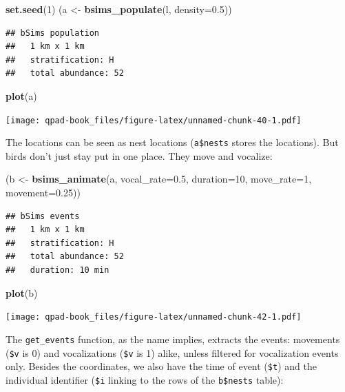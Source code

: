 \documentclass[12pt,]{book}
\newenvironment{Shaded}{\begin{snugshade}}{\end{snugshade}}
\newcommand{\DataTypeTok}[1]{\textcolor[rgb]{0.13,0.29,0.53}{#1}}
\newcommand{\DecValTok}[1]{\textcolor[rgb]{0.00,0.00,0.81}{#1}}
\newcommand{\FloatTok}[1]{\textcolor[rgb]{0.00,0.00,0.81}{#1}}
\newcommand{\KeywordTok}[1]{\textcolor[rgb]{0.13,0.29,0.53}{\textbf{#1}}}
\newcommand{\NormalTok}[1]{#1}
\newcommand{\StringTok}[1]{\textcolor[rgb]{0.31,0.60,0.02}{#1}}
\begin{document}
\begin{Shaded}
\begin{Highlighting}[]
\KeywordTok{set.seed}\NormalTok{(}\DecValTok{1}\NormalTok{)}
\NormalTok{(a <-}\StringTok{ }\KeywordTok{bsims_populate}\NormalTok{(l, }\DataTypeTok{density=}\FloatTok{0.5}\NormalTok{))}
\end{Highlighting}
\end{Shaded}

\begin{verbatim}
## bSims population
##   1 km x 1 km
##   stratification: H
##   total abundance: 52
\end{verbatim}

\begin{Shaded}
\begin{Highlighting}[]
\KeywordTok{plot}\NormalTok{(a)}
\end{Highlighting}
\end{Shaded}

\texttt{[image: qpad-book\_files/figure-latex/unnamed-chunk-40-1.pdf]}

The locations can be seen as nest locations (\texttt{a\$nests} stores the locations).
But birds don't just stay put in one place. They move and vocalize:

\begin{Shaded}
\begin{Highlighting}[]
\NormalTok{(b <-}\StringTok{ }\KeywordTok{bsims_animate}\NormalTok{(a, }
  \DataTypeTok{vocal_rate=}\FloatTok{0.5}\NormalTok{, }\DataTypeTok{duration=}\DecValTok{10}\NormalTok{,}
  \DataTypeTok{move_rate=}\DecValTok{1}\NormalTok{, }\DataTypeTok{movement=}\FloatTok{0.25}\NormalTok{))}
\end{Highlighting}
\end{Shaded}

\begin{verbatim}
## bSims events
##   1 km x 1 km
##   stratification: H
##   total abundance: 52
##   duration: 10 min
\end{verbatim}

\begin{Shaded}
\begin{Highlighting}[]
\KeywordTok{plot}\NormalTok{(b)}
\end{Highlighting}
\end{Shaded}

\texttt{[image: qpad-book\_files/figure-latex/unnamed-chunk-42-1.pdf]}

The \texttt{get\_events} function, as the name implies, extracts the events:
movements (\texttt{\$v} is 0) and vocalizations (\texttt{\$v} is 1) alike,
unless filtered for vocalization events only.
Besides the coordinates, we also have the time of event (\texttt{\$t}) and
the individual identifier (\texttt{\$i} linking to the rows of the \texttt{b\$nests} table):
\end{document}
